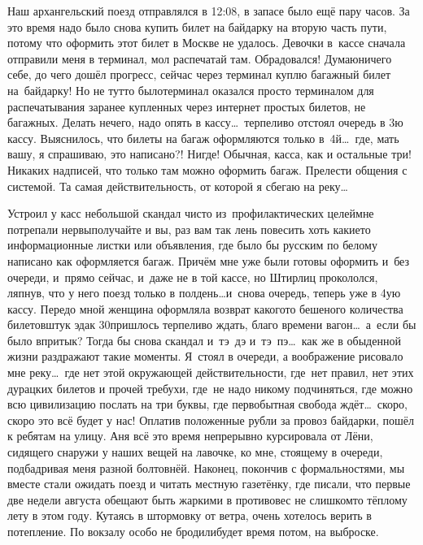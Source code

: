 Наш архангельский поезд отправлялся в 12:08, в запасе было ещё пару часов. За это время надо было снова купить билет на байдарку на вторую часть пути, потому что оформить этот билет в Москве не удалось. Девочки в~кассе сначала отправили меня в терминал, мол распечатай там. Обрадовался! Думаю\mdash ничего себе, до чего дошёл прогресс, сейчас через терминал куплю багажный билет на~байдарку! Но не тут\sdash то было\mdash терминал оказался просто терминалом для распечатывания заранее купленных через интернет простых билетов, не багажных. Делать нечего, надо опять в кассу\ldots~терпеливо отстоял очередь в 3\sdash ю кассу. Выяснилось, что билеты на багаж оформляются только в~4\sdash й\ldots~где, мать вашу, я спрашиваю, это написано?! Нигде! Обычная, касса, как и остальные три! Никаких надписей, что только там можно оформить багаж. Прелести общения с системой. Та самая действительность, от которой я сбегаю на реку\ldots~

Устроил у касс небольшой скандал чисто из~профилактических целей\mdash мне потрепали нервы\mdash получайте и вы, раз вам так лень повесить хоть какие\sdash то информационные листки или объявления, где было бы русским по белому написано как оформляется багаж. Причём мне уже были готовы оформить и~без очереди, и~прямо сейчас, и~даже не в той кассе, но Штирлиц прокололся, ляпнув, что у него поезд только в полдень\ldots и~снова очередь, теперь уже в 4\sdash ую кассу. Передо мной женщина оформляла возврат какого\sdash то бешеного количества билетов\mdash штук эдак 30\mdash пришлось терпеливо ждать, благо времени вагон\ldots~а~если бы было впритык? Тогда бы снова скандал и~тэ~дэ и~тэ~пэ\ldots~как же в обыденной жизни раздражают такие моменты. Я~стоял в очереди, а воображение рисовало мне реку\ldots~где нет этой окружающей действительности, где~нет правил, нет этих дурацких билетов и прочей требухи, где~не надо никому подчиняться, где можно всю цивилизацию послать на три буквы, где первобытная свобода ждёт\ldots~скоро, скоро это всё будет у нас!
\newpage
Оплатив положенные рубли за провоз байдарки, пошёл к ребятам на улицу. Аня всё это время непрерывно курсировала от Лёни, сидящего снаружи у наших вещей на лавочке, ко мне, стоящему в очереди, подбадривая меня разной болтовнёй. Наконец, покончив с формальностями, мы вместе стали ожидать поезд и читать местную газетёнку, где писали, что первые две недели августа обещают быть жаркими в противовес не слишком\sdash то тёплому лету в этом году. Кутаясь в штормовку от ветра, очень хотелось верить в потепление. По вокзалу особо не бродили\mdash будет время потом, на выброске.
 
